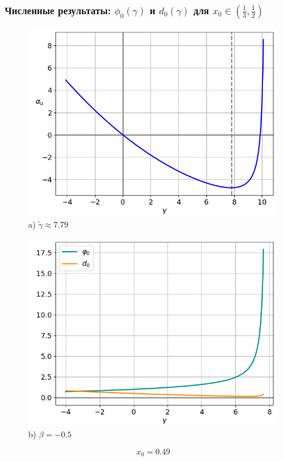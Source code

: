 \documentclass[fullscreen=true, unicode, bookmarks=false]{beamer}
\begin{document}
\begin{frame}
\frametitle{ Численные результаты: $ \phi_0(\gamma) $ и $ d_0(\gamma) $ для $ x_0 \in \left( \frac{1}{3}, \frac{1}{2} \right) $ }

\begin{figure} 
\begin{minipage}[h]{0.49\linewidth}
\begin{center}
\includegraphics[scale=0.38]{x0=0,49.png} \\ {\scriptsize a) $ \widetilde{\gamma} \approx 7.79 $}
\end{center}
\end{minipage} 
\hfill
\begin{minipage}[h]{0.49\linewidth}
\begin{center}
\includegraphics[scale=0.38]{divergent_phi0d0_x0=0,49,beta=0,5_before.png}  \\ {\scriptsize b) $ \beta = -0.5 $}
\end{center}
\end{minipage} 
\end{figure}

$$ x_0 = 0.49 $$

\end{frame}
\end{document}
